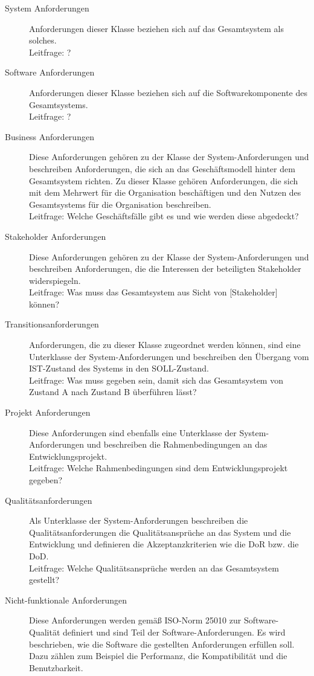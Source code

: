 \begin{description}
  \item[System Anforderungen] Anforderungen dieser Klasse beziehen sich auf das Gesamtsystem als solches.\\
  Leitfrage: \glqq ? \grqq
  \item[Software Anforderungen] Anforderungen dieser Klasse beziehen sich auf die Softwarekomponente des Gesamtsystems.\\
  Leitfrage: \glqq ? \grqq
  \item[Business Anforderungen] Diese Anforderungen gehören zu der Klasse der System-Anforderungen und beschreiben Anforderungen, die sich an das Geschäftsmodell hinter dem Gesamtsystem richten. Zu dieser Klasse gehören Anforderungen, die sich mit dem Mehrwert für die Organisation beschäftigen und den Nutzen des Gesamtsystems für die Organisation beschreiben.\\
  Leitfrage: \glqq Welche Geschäftsfälle gibt es und wie werden diese abgedeckt? \grqq
  \item[Stakeholder Anforderungen] Diese Anforderungen gehören zu der Klasse der System-Anforderungen und beschreiben Anforderungen, die die Interessen der beteiligten Stakeholder widerspiegeln.\\
  Leitfrage: \glqq Was muss das Gesamtsystem aus Sicht von [Stakeholder] können? \grqq
  \item[Transitionsanforderungen] Anforderungen, die zu dieser Klasse zugeordnet werden können, sind eine Unterklasse der System-Anforderungen und beschreiben den Übergang vom IST-Zustand des Systems in den SOLL-Zustand.\\
  Leitfrage: \glqq Was muss gegeben sein, damit sich das Gesamtsystem von Zustand A nach Zustand B überführen lässt? \grqq
  \item[Projekt Anforderungen] Diese Anforderungen sind ebenfalls eine Unterklasse der System-Anforderungen und beschreiben die Rahmenbedingungen an das Entwicklungsprojekt.\\
  Leitfrage: \glqq Welche Rahmenbedingungen sind dem Entwicklungsprojekt gegeben? \grqq
  \item[Qualitätsanforderungen] Als Unterklasse der System-Anforderungen beschreiben die Qualitätsanforderungen die Qualitätsansprüche an das System und die Entwicklung und definieren die Akzeptanzkriterien wie die \ac{DoR} bzw. die \ac{DoD}.\\
  Leitfrage: \glqq Welche Qualitätsansprüche werden an das Gesamtsystem gestellt? \grqq
  \item[Nicht-funktionale Anforderungen] Diese Anforderungen werden gemäß \ac{ISO}-Norm 25010 zur Software-Qualität definiert und sind Teil der Software-Anforderungen. Es wird beschrieben, wie die Software die gestellten Anforderungen erfüllen soll. Dazu zählen zum Beispiel die Performanz, die Kompatibilität und die Benutzbarkeit.\\

\end{description}
